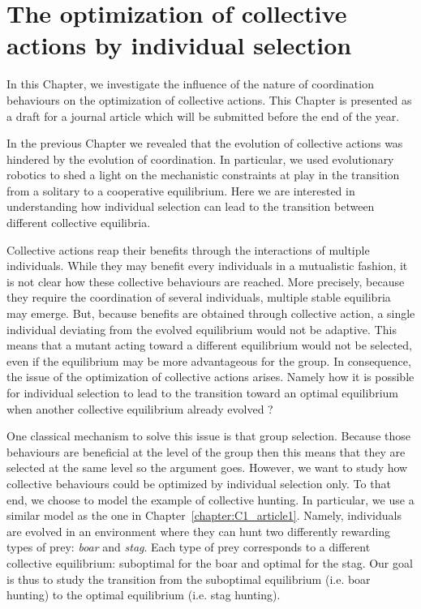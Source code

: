 \chapter{The optimization of collective actions by individual selection}
\label{chapter:C1_article2}

\setcounter{secnumdepth}{0}
\setcounter{minitocdepth}{1}
\minitoc[n] %

In this Chapter, we investigate the influence of the nature of coordination behaviours on the optimization of collective actions. This Chapter is presented as a draft for a journal article which will be submitted before the end of the year.

In the previous Chapter we revealed that the evolution of collective actions was hindered by the evolution of coordination. In particular, we used evolutionary robotics to shed a light on the mechanistic constraints at play in the transition from a solitary to a cooperative equilibrium. Here we are interested in understanding how individual selection can lead to the transition between different collective equilibria.

Collective actions reap their benefits through the interactions of multiple individuals. While they may benefit every individuals in a mutualistic fashion, it is not clear how these collective behaviours are reached. More precisely, because they require the coordination of several individuals, multiple stable equilibria may emerge. But, because benefits are obtained through collective action, a single individual deviating from the evolved equilibrium would not be adaptive. This means that a mutant acting toward a different equilibrium would not be selected, even if the equilibrium may be more advantageous for the group. In consequence, the issue of the optimization of collective actions arises. Namely how it is possible for individual selection to lead to the transition toward an optimal equilibrium when another collective equilibrium already evolved ?

One classical mechanism to solve this issue is that group selection. Because those behaviours are beneficial at the level of the group then this means that they are selected at the same level so the argument goes. However, we want to study how collective behaviours could be optimized by individual selection only. To that end, we choose to model the example of collective hunting. In particular, we use a similar model as the one in Chapter~\ref{chapter:C1_article1}. Namely, individuals are evolved in an environment where they can hunt two differently rewarding types of prey: \emph{boar} and \emph{stag}. Each type of prey corresponds to a different collective equilibrium: suboptimal for the boar and optimal for the stag. Our goal is thus to study the transition from the suboptimal equilibrium (i.e. boar hunting) to the optimal equilibrium (i.e. stag hunting).

